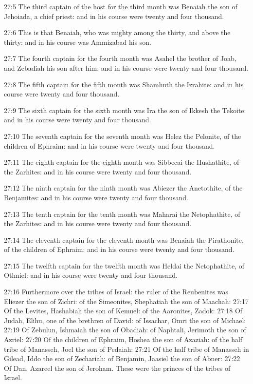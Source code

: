 27:5 The third captain of the host for the third month was Benaiah the son of Jehoiada, a chief priest: and in his course were twenty and four thousand.

27:6 This is that Benaiah, who was mighty among the thirty, and above the thirty: and in his course was Ammizabad his son.

27:7 The fourth captain for the fourth month was Asahel the brother of Joab, and Zebadiah his son after him: and in his course were twenty and four thousand.

27:8 The fifth captain for the fifth month was Shamhuth the Izrahite: and in his course were twenty and four thousand.

27:9 The sixth captain for the sixth month was Ira the son of Ikkesh the Tekoite: and in his course were twenty and four thousand.

27:10 The seventh captain for the seventh month was Helez the Pelonite, of the children of Ephraim: and in his course were twenty and four thousand.

27:11 The eighth captain for the eighth month was Sibbecai the Hushathite, of the Zarhites: and in his course were twenty and four thousand.

27:12 The ninth captain for the ninth month was Abiezer the Anetothite, of the Benjamites: and in his course were twenty and four thousand.

27:13 The tenth captain for the tenth month was Maharai the Netophathite, of the Zarhites: and in his course were twenty and four thousand.

27:14 The eleventh captain for the eleventh month was Benaiah the Pirathonite, of the children of Ephraim: and in his course were twenty and four thousand.

27:15 The twelfth captain for the twelfth month was Heldai the Netophathite, of Othniel: and in his course were twenty and four thousand.

27:16 Furthermore over the tribes of Israel: the ruler of the Reubenites was Eliezer the son of Zichri: of the Simeonites, Shephatiah the son of Maachah: 27:17 Of the Levites, Hashabiah the son of Kemuel: of the Aaronites, Zadok: 27:18 Of Judah, Elihu, one of the brethren of David: of Issachar, Omri the son of Michael: 27:19 Of Zebulun, Ishmaiah the son of Obadiah: of Naphtali, Jerimoth the son of Azriel: 27:20 Of the children of Ephraim, Hoshea the son of Azaziah: of the half tribe of Manasseh, Joel the son of Pedaiah: 27:21 Of the half tribe of Manasseh in Gilead, Iddo the son of Zechariah: of Benjamin, Jaasiel the son of Abner: 27:22 Of Dan, Azareel the son of Jeroham. These were the princes of the tribes of Israel.

